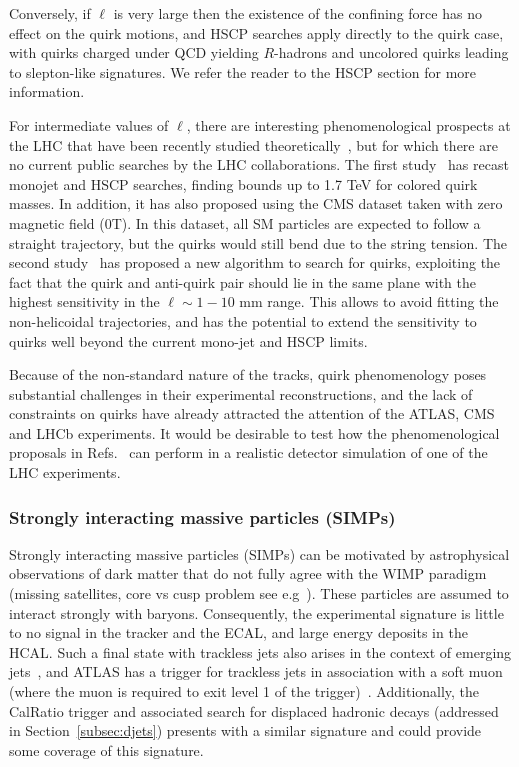 Conversely, if $\ell$ is very large then the existence of the confining force has no effect on the quirk motions, and HSCP searches  apply directly to the quirk case, with quirks charged under QCD yielding $R$-hadrons and uncolored quirks leading to slepton-like signatures. We refer the reader to the HSCP section for more information.

For intermediate values of $\ell$, there are interesting phenomenological prospects at the LHC that have been recently studied theoretically~\cite{Farina:2017cts,Knapen:2017kly}, but for which there are no current public searches by the LHC collaborations. The first study~\cite{Farina:2017cts} has recast monojet and HSCP searches, finding bounds up to 1.7 TeV for colored quirk masses. In addition, it has also proposed using the CMS dataset taken with zero magnetic field (0T). In this dataset, all SM particles are expected to follow a straight trajectory, but the quirks would still bend due to the string tension. The second study~\cite{Knapen:2017kly} has proposed a new algorithm to search for quirks, exploiting the fact that the quirk and anti-quirk pair should lie in the same plane with the highest sensitivity in the $\ell \sim 1-10$ mm range. This allows to avoid fitting the non-helicoidal trajectories, and has the potential to extend the sensitivity to quirks well beyond the current mono-jet and HSCP limits.

Because of the non-standard nature of the tracks, quirk phenomenology poses substantial challenges in their experimental reconstructions, and the lack of constraints on quirks have already attracted the attention of the ATLAS, CMS and LHCb experiments. It would be desirable to test how the phenomenological proposals in Refs.~\cite{Farina:2017cts,Knapen:2017kly} can perform in a realistic detector simulation of one of the LHC experiments.

\subsubsection{Strongly interacting massive particles (SIMPs)}

Strongly interacting massive particles (SIMPs) can be motivated by astrophysical observations of dark matter that do not fully agree with the WIMP paradigm (missing satellites, core vs cusp problem see e.g~\cite{2010arXiv1009.4505B,2011MNRAS.415L..40B,Weinberg:2013aya,1742-6596-437-1-012001}). These particles are assumed to interact strongly with baryons. Consequently, the experimental signature is little to no signal in the tracker and the ECAL, and large energy deposits in the HCAL. Such a final state with trackless jets also arises in the context of emerging jets~\cite{Schwaller:2015gea}, and ATLAS has a trigger for trackless jets in association with a soft muon (where the muon is required to exit level 1 of the trigger)~\cite{ATLASLLPTriggers}. Additionally, the CalRatio trigger and associated search for displaced hadronic decays (addressed in Section~\ref{subsec:djets}) presents with a similar signature and could provide some coverage of this signature.  

